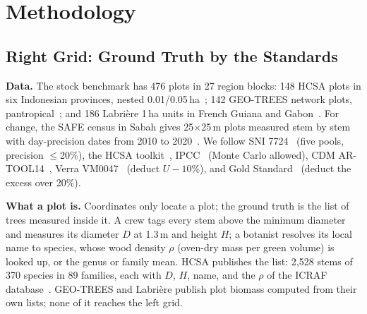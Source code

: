 \documentclass[conference,a4paper]{IEEEtran}
\begin{document}
\section{Methodology}

\subsection{Right Grid: Ground Truth by the Standards}
\label{sec:right}
\textbf{Data.} The stock benchmark has 476 plots in 27 region blocks: 148 HCSA plots in six Indonesian provinces, nested 0.01/0.05\,ha~\cite{hcsa2023data}; 142 GEO-TREES network plots, pantropical~\cite{geotrees2024}; and 186 Labri\`ere 1\,ha units in French Guiana and Gabon~\cite{labriere2018insitu}. For change, the SAFE census in Sabah gives 25$\times$25\,m plots measured stem by stem with day-precision dates from 2010 to 2020~\cite{svatek2025safe}. We follow SNI 7724~\cite{sni7724} (five pools, precision $\le$20\%), the HCSA toolkit~\cite{rosoman2017hcsa}, IPCC~\cite{ipcc2019v4} (Monte Carlo allowed), CDM AR-TOOL14~\cite{artool14}, Verra VM0047~\cite{verra2025vm0047} (deduct $U-10\%$), and Gold Standard~\cite{gs2024ar} (deduct the excess over 20\%).

\textbf{What a plot is.} Coordinates only locate a plot; the ground truth is the list of trees measured inside it. A crew tags every stem above the minimum diameter and measures its diameter $D$ at 1.3\,m and height $H$; a botanist resolves its local name to species, whose wood density $\rho$ (oven-dry mass per green volume) is looked up, or the genus or family mean. HCSA publishes the list: 2{,}528 stems of 370 species in 89 families, each with $D$, $H$, name, and the $\rho$ of the ICRAF database~\cite{hcsa2023data}. GEO-TREES and Labri\`ere publish plot biomass computed from their own lists; none of it reaches the left grid.
\end{document}
